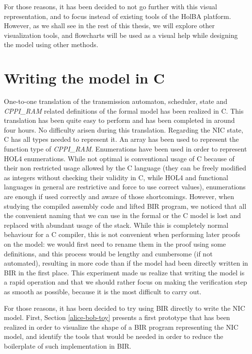 \documentclass{kththesis}
\begin{document}
For those reasons, it has been decided to not go further with this visual representation, and to focus instead of existing tools of the HolBA platform. However, as we shall see in the rest of this thesis, we will explore other visualization tools, and flowcharts will be used as a visual help while designing the model using other methods.

\section{Writing the model in C} \label{c-model}

One-to-one translation of the transmission automaton, scheduler, state and \textit{CPPI\_RAM} related definitions of the formal model has been realized in C. This translation has been quite easy to perform and has been completed in around four hours. No difficulty arisen during this translation. Regarding the NIC state, C has all types needed to represent it. An array has been used to represent the function type of \textit{CPPI\_RAM}. Enumerations have been used in order to represent HOL4 enumerations. While not optimal is conventional usage of C because of their non restricted usage allowed by the C language (they can be freely modified as integers without checking their validity in C, while HOL4 and functional languages in general are restrictive and force to use correct values), enumerations are enough if used correctly and aware of those shortcomings. However, when studying the compiled assembly code and lifted BIR program, we noticed that all the convenient naming that we can use in the formal or the C model is lost and replaced with abundant usage of the stack. While this is completely normal behaviour for a C compiler, this is not convenient when performing later proofs on the model: we would first need to rename them in the proof using some definitions, and this process would be lengthy and cumbersome (if not automated), resulting in more code than if the model had been directly written in BIR in the first place. This experiment made us realize that writing the model is a rapid operation and that we should rather focus on making the verification step as smooth as possible, because it is the most difficult to carry out.

For those reasons, it has been decided to try using BIR directly to write the NIC model. First, Section \ref{alice-bob-toy} presents a first prototype that has been realized in order to visualize the shape of a BIR program representing the NIC model, and identify the tools that would be needed in order to reduce the boilerplate of such implementation in BIR.
\end{document}
